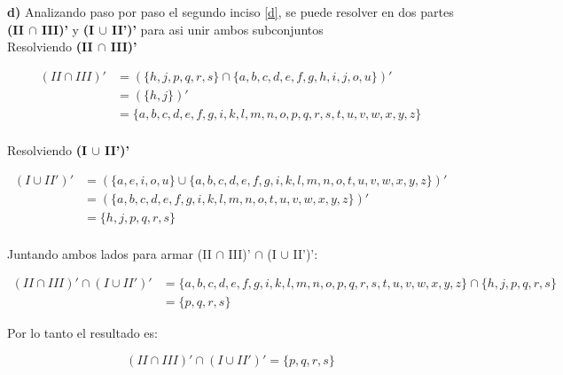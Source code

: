 \newpage

\textbf{d)} Analizando paso por paso el segundo inciso \ref{d}, se puede resolver en dos partes \textbf{(II $\cap$ III)'} y \textbf{(I $\cup$ II')'} para asi unir ambos subconjuntos \\

Resolviendo \textbf{(II $\cap$ III)'}

\begin{align*}
 (II \cap III)' &=( \{ h, j, p, q, r, s  \} \cap \{ a, b, c, d, e, f, g, h, i, j, o, u  \}    )'  \\
  &=   (\{ h, j \})'       \\
    &=   \{ a, b, c, d, e, f, g, i, k, l, m, n, o, p, q, r, s, t, u, v, w, x, y, z \}        \\
\end{align*}

Resolviendo \textbf{(I $\cup$ II')'}

\begin{align*}
(I \cup II')'  &=  ( \{a, e, i, o, u\} \cup \{ a, b, c, d, e, f, g, i, k, l, m, n, o, t, u, v, w, x, y, z \}  )'\\
  &=  ( \{ a, b, c, d, e, f, g, i, k, l, m, n, o, t, u, v, w, x, y, z \}  )' \\
  &=       \{h, j, p, q, r, s \}\\
\end{align*}

Juntando ambos lados para armar (II $\cap$ III)' $\cap$ (I $\cup$ II')':

\begin{align*}
(II \cap III)' \cap (I \cup II')' &= \{ a, b, c, d, e, f, g, i, k, l, m, n, o, p, q, r, s, t, u, v, w, x, y, z \} \cap \{h, j, p, q, r, s \} \\
  &= \{p, q, r, s \}
\end{align*}

Por lo tanto el resultado es:

\begin{equation*}
    \boxed{ (II \cap III)' \cap (I \cup II')' =   \{p, q, r, s \}   }
\end{equation*}